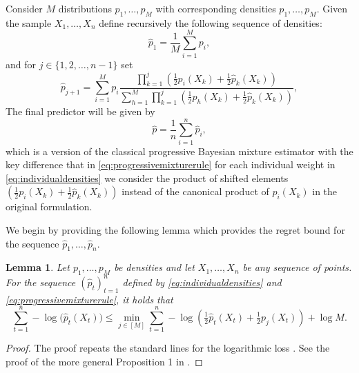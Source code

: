 \documentclass[11pt]{article}
\renewcommand{\le}{\leqslant}
\newcommand{\M}{M}
\newtheorem{lemma}{Lemma}
\theoremstyle{definition}
\theoremstyle{remark}
\begin{document}
Consider $\M$ distributions $p_1, \ldots, p_\M$ with corresponding densities $p_1, \ldots, p_\M$. Given the sample $X_1, \ldots, X_n$ define recursively the following sequence of densities:
\[
\widehat{p}_{1} = \frac{1}{\M}\sum\limits_{i = 1}^M p_i,
\]
and for $j \in \{1, 2, \ldots, n-1\}$ set
\begin{equation}
\label{eq:individualdensities}
\widehat{p}_{j+1} = \sum\limits_{i = 1}^Mp_i \frac{\prod_{k = 1}^{j}\left(\frac{1}{2}p_i(X_k) + \frac{1}{2}\widehat{p}_{k}(X_k)\right)}{\sum\nolimits_{h = 1}^M\prod_{k = 1}^{j}\left(\frac{1}{2}p_h(X_k) + \frac{1}{2}\widehat{p}_{k}(X_k)\right)},
\end{equation}
The final predictor will be given by 
\begin{equation}
\label{eq:progressivemixturerule}
\widehat{p} = \frac{1}{n}\sum\limits_{i = 1}^n\widehat{p}_{i},
\end{equation}
which is a version of the classical progressive Bayesian mixture estimator \cite{barron1987bayes, yang1999information} with the key difference that in \eqref{eq:progressivemixturerule} for each individual weight in \eqref{eq:individualdensities} we consider the product of shifted elements $\left(\frac{1}{2}p_i(X_k) + \frac{1}{2}\widehat{p}_{k}(X_k)\right)$ instead of the canonical product of $p_i(X_k)$ in the original formulation.

We begin by providing the following lemma which provides the regret bound for the sequence $\widehat{p}_{1}, \ldots, \widehat{p}_{n}$.

\begin{lemma}
\label{eq:regretboundforshiftedloss}
Let $p_1,\ldots,p_\M$ be densities and let $X_1,\ldots,X_n$ be any sequence of points.
For the sequence $(\widehat p_t)_{t=1}^n$ defined by \eqref{eq:individualdensities} and
\eqref{eq:progressivemixturerule}, it holds that
\begin{equation}\label{eq:shifted-regret}
\sum_{t=1}^{n}-\log\big(\widehat{p}_t(X_t)\big)
\le
\min_{j\in[M]}\sum_{t=1}^{n}-\log\left(\tfrac{1}{2}\widehat{p}_t(X_t)+\tfrac{1}{2}p_j(X_t)\right)+\log M .
\end{equation}
\end{lemma}

\begin{proof}
The proof repeats the standard lines for the logarithmic loss \cite{vovk1990aggregating}. See the proof of the more general Proposition 1 in \cite{vanderhoeven2023high}.
\end{proof}
\end{document}
